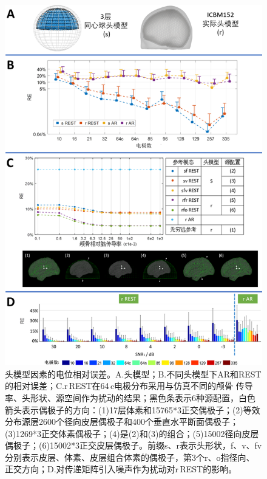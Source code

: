 \begin{figure}[!ht]
	\centering
	\includegraphics[width=12cm]{pic/JNE/figure9.png}
	\caption{头模型因素的电位相对误差。A.头模型；B.不同头模型下AR和REST的相对误差；C.r\,REST在64\,c电极分布采用与仿真不同的颅骨
	传导率、头形状、源空间作为扰动的结果；黑色条表示6种源配置，白色箭头表示偶极子的方向：(1)17层体素和15765*3正交偶极子；(2)等效分布源层2600个径向皮层偶极子和400个垂直水平断面偶极子；(3)1269*3正交体素偶极子；(4)是(2)和(3)的组合；(5)15002径向皮层偶极子；(6)15002*3正交皮层偶极子。前缀s、r表示头形状，f、v、fv分别表示皮层、体素、皮层组合体素的偶极子，第3个r、o指径向、正交方向；D.对传递矩阵引入噪声作为扰动对r\,REST的影响。}
	\label{2:hm}
\end{figure}
